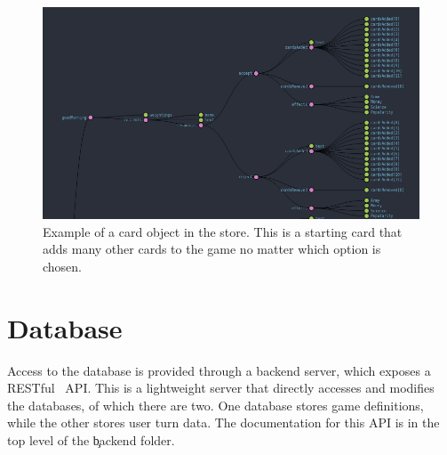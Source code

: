 \begin{figure}[!h]
	\centering
	\includegraphics[width=1.0\textwidth]{./images/design/card_example.png}
	\caption{Example of a card object in the store. This is a starting card that adds many other cards to the game no matter which option is chosen.}
	\label{fig:card_example}
\end{figure}

\section{Database}
Access to the database is provided through a backend server, which exposes a RESTful~\cite{REST} API. This is a lightweight server that directly accesses and modifies the databases, of which there are two. One database stores game definitions, while the other stores user turn data.
The documentation for this API is in the top level of the \c{backend} folder.
